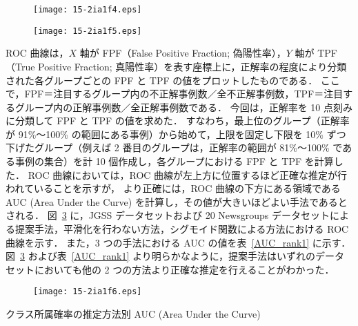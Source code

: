 \documentclass[japanese]{jnlp_1.4}
\begin{document}
\begin{figure}[b]
\begin{center}
\texttt{[image: 15-2ia1f4.eps]}
\label{reliability_JGSS}
\end{center}
\end{figure}
\begin{figure}[b]
\begin{center}
\texttt{[image: 15-2ia1f5.eps]}
\label{reliability_20ng}
\end{center}
\end{figure}

ROC 曲線は，$X$ 軸が FPF（False Positive Fraction; 偽陽性率），$Y$ 軸が TPF（True Positive Fraction; 真陽性率）を表す座標上に，正解率の程度により分類された各グループごとの FPF と TPF の値をプロットしたものである．
ここで，FPF＝注目するグループ内の不正解事例数／全不正解事例数，TPF＝注目するグループ内の正解事例数／全正解事例数である．
今回は，正解率を 10 点刻みに分類して FPF と TPF の値を求めた．
すなわち，最上位のグループ（正解率が 91\%〜100\% の範囲にある事例）から始めて，上限を固定し下限を 10\% ずつ下げたグループ（例えば 2 番目のグループは，正解率の範囲が 81\%〜100\% である事例の集合）を計 10 個作成し，各グループにおける FPF と TPF を計算した．
ROC 曲線においては，ROC 曲線が左上方に位置するほど正確な推定が行われていることを示すが，
より正確には，ROC 曲線の下方にある領域である AUC (Area Under the Curve) を計算し，その値が大きいほどよい手法であるとされる．
図~\ref{ROC_JGSS_20ns} に，JGSS データセットおよび 20 Newsgroups データセットによる提案手法，平滑化を行わない方法，シグモイド関数による方法における ROC 曲線を示す．
また，3 つの手法における AUC の値を表~\ref{AUC_rank1} に示す．
図~\ref{ROC_JGSS_20ns} および表~\ref{AUC_rank1} より明らかなように，提案手法はいずれのデータセットにおいても他の 2 つの方法より正確な推定を行えることがわかった．

\begin{figure}[b]
\begin{center}
\texttt{[image: 15-2ia1f6.eps]}
\label{ROC_JGSS_20ns}
\end{center}
\end{figure}
\begin{table}[b]
\begin{center}
\caption{クラス所属確率の推定方法別 AUC (Area Under the Curve)}
\label{AUC_rank1}

\end{center}
\end{table}
\end{document}
